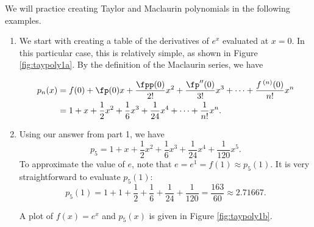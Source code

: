 We will practice creating Taylor and Maclaurin polynomials in the following examples.
\pagebreak

{\begin{enumerate}
\item We start with creating a table of the derivatives of $e^x$ evaluated at $x=0$. In this particular case, this is relatively simple, as shown in Figure \ref{fig:taypoly1a}.
By the definition of the Maclaurin series, we have 

\begin{align*}
p_n(x) &= f(0) + \fp(0)x + \frac{\fpp(0)}{2!}x^2+\frac{\fp''(0)}{3!}x^3+\cdots+\frac{f\,^{(n)}(0)}{n!}x^n\\
			&= 1+x+\frac{1}{2}x^2+\frac{1}{6}x^3 + \frac{1}{24}x^4 + \cdots + \frac{1}{n!}x^n.
\end{align*}

\item	Using our answer from part 1, we have 
\[
p_5 = 1+x+\frac{1}{2}x^2+\frac{1}{6}x^3 + \frac{1}{24}x^4 + \frac{1}{120}x^5.
\]
To approximate the value of $e$, note that $e = e^1 = f(1) \approx p_5(1).$ It is very straightforward to evaluate $p_5(1)$:
\[
p_5(1) = 1+1+\frac12+\frac16+\frac1{24}+\frac1{120} = \frac{163}{60} \approx 2.71667.
\]

A plot of $f(x)=e^x$ and $p_5(x)$ is given in Figure \ref{fig:taypoly1b}.
\end{enumerate}
\baselineskip
}\\


